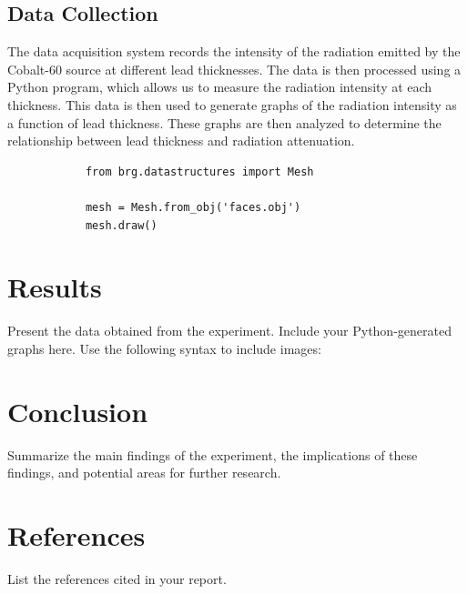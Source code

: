 \documentclass[12pt]{article}
\begin{document}
        \subsection{Data Collection}
            The data acquisition system records the intensity of the radiation emitted by the Cobalt-60 source at different lead thicknesses. 
            The data is then processed using a Python program, which allows us to measure the radiation intensity at each thickness. 
            This data is then used to generate graphs of the radiation intensity as a function of lead thickness. 
            These graphs are then analyzed to determine the relationship between lead thickness and radiation attenuation.
            \lstset{language=Python}
            \lstset{frame=lines}
            \lstset{basicstyle=\footnotesize}
            \begin{lstlisting}
            from brg.datastructures import Mesh
            
            mesh = Mesh.from_obj('faces.obj')
            mesh.draw()
            \end{lstlisting}
                

\section{Results}
    Present the data obtained from the experiment. Include your Python-generated graphs here. Use the following syntax to include images:
    

\section{Conclusion}
    Summarize the main findings of the experiment, the implications of these findings, and potential areas for further research.

\section{References}
    List the references cited in your report.
\end{document}
